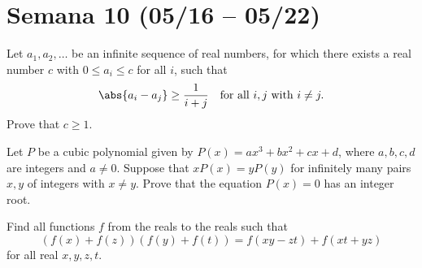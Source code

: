 \section{Semana 10 (05/16 -- 05/22)}


\begin{probEG}
	Let $a_1,a_2,\dots$ be an infinite sequence of real numbers, for which there exists a real number $c$ with $0\le a_i\le c$ for all $i$, such that
	\[\abs{a_i-a_j}\ge\frac{1}{i+j}\quad\text{for all }i,j\text{ with }i\ne j.\]
	Prove that $c\ge 1$.
\end{probEG}

\begin{probMR}
	Let $P$ be a cubic polynomial given by $P(x)=ax^3+bx^2+cx+d$, where $a,b,c,d$ are integers and $a\ne 0$. Suppose that $xP(x)=yP(y)$ for infinitely many pairs $x,y$ of integers with $x\ne y$. Prove that the equation $P(x)=0$ has an integer root.
\end{probMR}

\begin{probMB}
	Find all functions $f$ from the reals to the reals such that
	\[\left(f(x)+f(z)\right)\left(f(y)+f(t)\right)=f(xy-zt)+f(xt+yz)\]
	for all real $x,y,z,t$.
\end{probMB}
